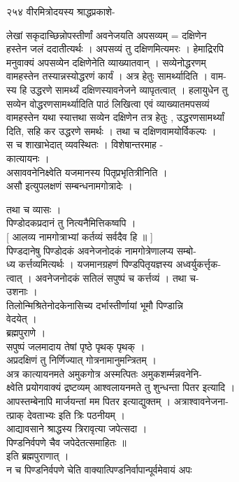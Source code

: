 \documentclass[11pt, openany]{book}
\begin{document}
{{{{{{{{{{{{{{{२५४ वीरमित्रोदयस्य श्राद्धप्रकाशे-\\
}{लेखां सकृदाच्छिन्नोपस्तीर्णां अवनेजयति अपसव्यम् = दक्षिणेन\\
हस्तेन जलं ददातीत्यर्थः । अपसव्यं तु दक्षिणमित्यमरः । हेमाद्रिरपि\\
मनुवाक्यं अपसव्येन दक्षिणेनेति व्याख्यातवान् । सव्येनोद्धरणम्\\
वामहस्तेन तस्यान्नस्योद्धरणं कार्यं । अत्र हेतुः सामर्थ्यादिति । वाम-\\
स्य हि उद्धरणे सामर्थ्यं दक्षिणस्यावनेजने व्यापृतत्वात् । हलायुधेन तु\\
सव्येन वोद्धरणसामर्थ्यादिति पाठं लिखित्वा एवं व्याख्यातमपसव्यं\\
वामहस्तेन यथा स्यात्तथा सव्येन दक्षिणेन तत्र हेतुः , उद्धरणसामर्थ्यां\\
दिति, सहि कर उद्धरणे समर्थः । तथा च दक्षिणवामयोर्विकल्पः ।\\
स च शाखाभेदात् व्यवस्थितः । विशेषान्तरमाह -\\
कात्यायनः ।\\
असाववनेनिक्ष्वेति यजमानस्य पितृप्रभृतित्रीनिति ।\\
असौ इत्युपलक्षणं सम्बन्धनामगोत्रादेः ।

{तथा च व्यासः ।\\
पिण्डोदकप्रदानं तु नित्यनैमित्तिकष्वपि ।\\
{[} आलव्य नामगोत्राभ्यां कर्तव्यं सर्वदैव हि ॥ {]}\\
पिण्डदानेषु पिण्डोदकं अवनेजनोदकं नामगोत्रेणालप्य सम्बो-\\
ध्य कर्त्तव्यमित्यर्थः । यजमानग्रहणं पिण्डपितृयज्ञस्य
अध्वर्युकर्त्तृक-\\
त्वात् । अवनेजनोदकं सतिलं सपुष्पं च कर्त्तव्यं । तथा च-\\
उशनाः ।\\
तिलोन्मिश्रितेनोदकेनासिच्य दर्भास्तीर्णायां भूमौ पिण्डान्नि\\
वेदयेत् ।\\
ब्रह्मपुराणे ।\\
सपुष्पं जलमादाय तेषां पृष्ठे पृथक् पृथक् ।\\
अप्रदक्षिणं तु निर्णिज्यात् गोत्रनामानुमन्त्रितम् ।\\
अत्र कात्यायनमते अमुकगोत्र अस्मत्पितः अमुकशर्म्मन्नवनेनि-\\
क्ष्वेति प्रयोगवाक्यं द्रष्टव्यम् आश्वलायनमते तु शुन्धन्ता पितर इत्यादि
।\\
आपस्तम्बेनापि मार्जयन्तां मम पितर इत्याद्युक्तम् । अत्राश्वावनेजना-\\
त्प्राक् देवताभ्यः इति त्रिः पठनीयम् ।\\
आद्यावसाने श्राद्धस्य त्रिरावृत्या जपेत्सदा ।\\
पिण्डनिर्वपणे चैव जपेदेतत्समाहितः ॥\\
इति ब्रह्मपुराणात् ।\\
न च पिण्डनिर्वपणे चेति वाक्यात्पिण्डनिर्वापान्पूर्वमेवायं अपः

}}}}}}}}}}}}}}}}
\end{document}
